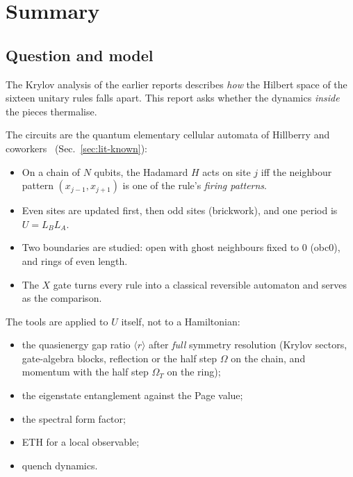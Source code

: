 \section{Summary}
\label{sec:summary}

\subsection{Question and model}
The Krylov analysis of the earlier reports describes \emph{how} the Hilbert space of the sixteen unitary rules falls
apart. This report asks whether the dynamics \emph{inside} the pieces thermalise.

The circuits are the quantum elementary cellular automata of Hillberry and coworkers~\cite{hillberry2016,hillberry2021}
(Sec.~\ref{sec:lit-known}):
\begin{itemize}
\item On a chain of $N$ qubits, the Hadamard $H$ acts on site $j$ iff the neighbour pattern $(x_{j-1},x_{j+1})$ is one of
  the rule's \emph{firing patterns}.
\item Even sites are updated first, then odd sites (brickwork), and one period is $U=L_BL_A$.
\item Two boundaries are studied: open with ghost neighbours fixed to 0 (obc0), and rings of even length.
\item The $X$ gate turns every rule into a classical reversible automaton and serves as the comparison.
\end{itemize}

The tools are applied to $U$ itself, not to a Hamiltonian:
\begin{itemize}
\item the quasienergy gap ratio $\langle r\rangle$ after \emph{full} symmetry resolution (Krylov sectors, gate-algebra
  blocks, reflection or the half step $\Omega$ on the chain, and momentum with the half step $\Omega_T$ on the ring);
\item the eigenstate entanglement against the Page value;
\item the spectral form factor;
\item ETH for a local observable;
\item quench dynamics.
\end{itemize}

